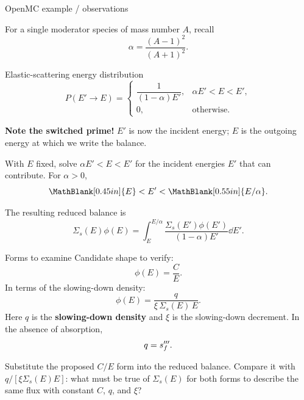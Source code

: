 \begin{handoutcolumns}
\begin{boardbox}{OpenMC example / observations}
\end{boardbox}

\switchcolumn
\RaggedRight
{}
For a single moderator species of mass number $A$, recall
$$
\alpha=\frac{(A-1)^2}{(A+1)^2}.
$$
\begin{fixedbox}{Elastic-scattering energy distribution}
$$
P(E'\!\to\!E)=
\begin{cases}
\dfrac{1}{(1-\alpha)E'},&\alpha E'<E<E',\\[4pt]
0,&\text{otherwise}.
\end{cases}
$$
\end{fixedbox}
\textbf{Note the switched prime!} $E'$ is now the incident energy;
$E$ is the outgoing energy at which we write the balance.

\begin{checkpoint}
With $E$ fixed, solve $\alpha E'<E<E'$ for the incident energies
$E'$ that can contribute. For $\alpha>0$,
$$
\MathBlank[0.45in]{E}<E'<\MathBlank[0.55in]{E/\alpha}.
$$
\end{checkpoint}

The resulting reduced balance is
$$
\Sigma_s(E)\phi(E)=
\int_E^{E/\alpha}\frac{\Sigma_s(E')\phi(E')}{(1-\alpha)E'}\dd E'.
$$

\begin{fixedbox}{Forms to examine}
Candidate shape to verify:
$$
\phi(E)=\frac{C}{E}.
$$
In terms of the slowing-down density:
$$
\boxed{\displaystyle\phi(E)=\frac{q}{\xi\,\Sigma_s(E)\,E}}.
$$
Here $q$ is the \textbf{slowing-down density} and $\xi$ is the
slowing-down decrement. In the absence of absorption,
$$
q=s_f^{\prime\prime\prime}.
$$
\end{fixedbox}

\begin{checkpoint}
Substitute the proposed $C/E$ form into the reduced balance.
Compare it with $q/[\xi\Sigma_s(E)E]$: what must be true of
$\Sigma_s(E)$ for both forms to describe the same flux with constant
$C$, $q$, and $\xi$?
\end{checkpoint}
\end{handoutcolumns}


